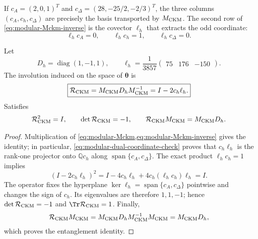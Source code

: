 If \(c_A=(2,0,1)^T\) and
\(c_\Delta=(28,-25/2,-2/3)^T\), the three columns
\((c_A,c_h,c_\Delta)\) are precisely the basis transported by
\(M_{\rm CKM}\). The second row of
\cref{eq:modular-Mckm-inverse} is the covector \(\ell_h\) that extracts the
odd coordinate:
\begin{equation}
\label{eq:modular-dual-coordinate-check}
\ell_hc_A=0,
\qquad
\ell_hc_h=1,
\qquad
\ell_hc_\Delta=0.
\end{equation}

\begin{theorem}
\label{thm:modular-ckm-reflection}
Let
\begin{equation}
\label{eq:modular-Dh-lh}
D_h=\operatorname{diag}(1,-1,1),
\qquad
\ell_h=\frac1{3857}\begin{pmatrix}75&176&-150\end{pmatrix}.
\end{equation}
The involution induced on the space of \(\boldsymbol\theta\) is
\begin{equation}
\label{eq:modular-Rckm}
\boxed{
\mathcal R_{\rm CKM}
=M_{\rm CKM}D_hM_{\rm CKM}^{-1}
=I-2c_h\ell_h.}
\end{equation}
Satisfies
\begin{equation}
\label{eq:modular-Rckm-properties}
\mathcal R_{\rm CKM}^2=I,
\qquad
\det\mathcal R_{\rm CKM}=-1,
\qquad
\mathcal R_{\rm CKM}M_{\rm CKM}=M_{\rm CKM}D_h.
\end{equation}
\end{theorem}

\begin{proof}
Multiplication of
\cref{eq:modular-Mckm,eq:modular-Mckm-inverse} gives the identity; in
particular, \cref{eq:modular-dual-coordinate-check} proves that
\(c_h\ell_h\) is the rank-one projector onto \(\mathbb Qc_h\) along
\(\operatorname{span}\{c_A,c_\Delta\}\). The exact product
\(\ell_hc_h=1\) implies
\[
(I-2c_h\ell_h)^2
=I-4c_h\ell_h+4c_h(\ell_hc_h)\ell_h=I.
\]
The operator fixes the hyperplane
\(\ker\ell_h=\operatorname{span}\{c_A,c_\Delta\}\) pointwise and changes the sign of
\(c_h\). Its eigenvalues are therefore \(1,1,-1\); hence
\(\det\mathcal R_{\rm CKM}=-1\) and
\(\Tr\mathcal R_{\rm CKM}=1\). Finally,
\[
\mathcal R_{\rm CKM}M_{\rm CKM}
=M_{\rm CKM}D_hM_{\rm CKM}^{-1}M_{\rm CKM}
=M_{\rm CKM}D_h,
\]
which proves the entanglement identity.
\end{proof}

